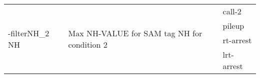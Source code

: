 {\small
\begin{tabular}{@{}p{}p{}l@{}}
\multirow{4}{=}{-filterNH\_2 NH} & \multirow{4}{=}{Max NH-VALUE for SAM tag NH for condition 2} & call-2 \\
 &  & pileup \\
 &  & rt-arrest \\
 &  & lrt-arrest \\
\end{tabular}\\
}
